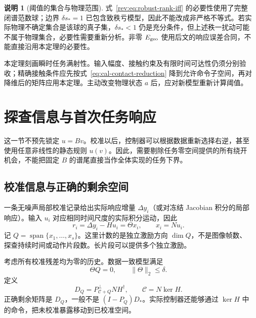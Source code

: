 \documentclass[11pt,a4paper]{article}
\numberwithin{equation}{section}
\theoremstyle{definition}
\newtheorem{remark}[theorem]{说明}
\begin{document}
\begin{remark}[阈值的集合与物理范围]
\label{rev:rem:rank-scope}
式~\eqref{rev:eq:robust-rank-iff} 的必要性使用了完整闭谱范数球；边界 $\delta s_*=1$ 已包含致秩亏模型，因此不能改成非严格不等式。若实际物理不确定集合是该球的真子集，$\delta s_*<1$ 仍是充分条件，但上述秩一扰动可能不属于物理集合，必要性需要重新分析。非零 $E_{\rm geo}$ 使用后文的响应误差合同，不能直接沿用本定理的必要性。

本定理刻画瞬时任务满射性。输入幅度、接触约束及有限时间可达性仍须分别验收；精确接触条件应先按式~\eqref{eq:cal-contact-reduction} 降到允许命令子空间，再对降维后的矩阵应用本定理。主动改变物理状态 $a$ 后，应对新模型重新计算阈值。
\end{remark}





\section{探查信息与首次任务响应}
\label{sec:cal-minimax}

这一节不预先锁定 $u=Bv$。校准以后，控制器可以根据数据重新选择右逆，甚至使用任意非线性的静态规则 $u(v)$。因此，需要剔除任务零空间提供的所有绕开机会，不能把固定 $B$ 的谱尾直接当作全体实现的任务下界。

\subsection{校准信息与正确的剩余空间}

一条无噪声局部校准记录给出实际响应增量 $\Delta y_i$（或对冻结 Jacobian 积分的局部响应）。输入 $u_i$ 对应相同时间尺度的实际积分运动，因此
\begin{equation}
  r_i=\Delta y_i-Hu_i=\Theta x_i,\qquad x_i=Nu_i .
  \label{eq:cal-probe-oracle}
\end{equation}
记 $Q=\operatorname{span}\{x_1,\ldots,x_s\}$。这里计数的是独立激励方向 $\dim Q$，不是图像帧数、探查持续时间或动作片段数。长片段可以提供多个独立激励。

考虑所有校准残差均为零的历史。数据一致模型满足
\begin{equation}
  \Theta Q=0,\qquad \|\Theta\|_2\le\delta .
  \label{eq:cal-zero-history}
\end{equation}
定义
\begin{equation}
  D_Q=P_{\mathcal C+Q}^{\perp}NH^\dagger,
  \qquad \mathcal C=N\ker H .
  \label{eq:cal-DQ}
\end{equation}
正确剩余矩阵是 $D_Q$，一般不是 $(I-P_Q)D_*$。实际控制器还能够通过 $\ker H$ 中的命令，把未校准暴露移动到已校准空间。
\end{document}
